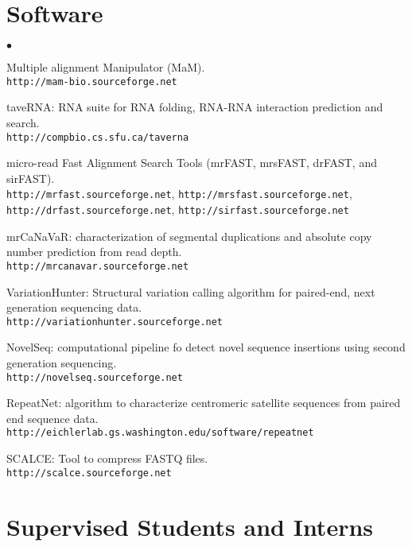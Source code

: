 \documentclass[margin,line]{res}
\newenvironment{list2}{
  \begin{list}{$\bullet$}{%
      \setlength{\itemsep}{0in}
      \setlength{\parsep}{0in} \setlength{\parskip}{0in}
      \setlength{\topsep}{0in} \setlength{\partopsep}{0in} 
      \setlength{\leftmargin}{0.2in}}}{\end{list}}
\begin{document}
\begin{resume}
\section{\sc Software}
\begin{list2}
\item
  Multiple alignment Manipulator (MaM).\\
  {\tt http://mam-bio.sourceforge.net}
\item
  taveRNA: RNA suite for RNA folding, RNA-RNA interaction prediction and search.\\
  {\tt http://compbio.cs.sfu.ca/taverna}

\item
  micro-read Fast Alignment Search Tools (mrFAST, mrsFAST, drFAST, and sirFAST).\\
  {\tt http://mrfast.sourceforge.net},
  {\tt http://mrsfast.sourceforge.net},
  {\tt http://drfast.sourceforge.net},  {\tt http://sirfast.sourceforge.net}
\item
  mrCaNaVaR: characterization of segmental duplications and absolute copy number prediction from read depth.\\
  {\tt http://mrcanavar.sourceforge.net}
\item
  VariationHunter: Structural variation calling algorithm for paired-end, next
  generation sequencing data.\\
  {\tt http://variationhunter.sourceforge.net}
\item
  NovelSeq: computational pipeline fo detect novel sequence insertions using second generation sequencing.\\
  {\tt http://novelseq.sourceforge.net}
\item
  RepeatNet: algorithm to characterize centromeric satellite sequences from paired end sequence data.\\
  {\tt http://eichlerlab.gs.washington.edu/software/repeatnet}
\item
  SCALCE: Tool to compress FASTQ files. \\
  {\tt http://scalce.sourceforge.net}
\end{list2}

\vspace*{-.2cm}
\section{\sc Supervised Students and Interns}


\end{resume}
\end{document}
